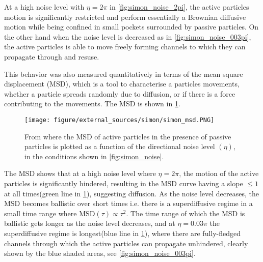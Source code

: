 At a high noise level with $\eta=2\pi$ in \cref{fig:simon_noise_2pi}, the active particles motion is significantly 
restricted and perform essentially a Brownian diffusive motion while being confined in small pockets surrounded by passive particles. 
On the other hand when the noise level is decreased as in \cref{fig:simon_noise_003pi}, the active particles is 
able to move freely forming channels to which they can propagate through and resuse.

This behavior was also measured quantitatively in terms of the mean square displacement (MSD), which 
is a tool to characterise a particles movements, whether a particle spreads randomly due to diffusion, or 
if there is a force contributing to the movements. The MSD is shown in \cref{fig:simon_msd}.

\begin{figure}[htp]
    \centering
    \texttt{[image: figure/external\_sources/simon/simon\_msd.PNG]}
    \caption{From \cite{nilsson2017metastable} where the MSD 
    of active particles in the presence of passive particles is plotted as a function of the directional
    noise level $(\eta)$, in the conditions shown in \cref{fig:simon_noise}.}
    \label{fig:simon_msd}
\end{figure}

The MSD shows that at a high noise level where $\eta=2\pi$, the motion of the active particles 
is significantly hindered, resulting in the MSD curve having a slope $\leq1$ at all times(green line in \cref{fig:simon_msd}), 
suggesting diffusion. As the noise level decreases, the MSD becomes ballistic over short times i.e. there 
is a superdiffusive regime in a small time range where $\text{MSD}(\tau)\propto\tau^2$. The time range of which the MSD is ballistic gets longer 
as the noise level decreases, and at $\eta=0.03\pi$ the superdiffusive regime is longest(blue line in \cref{fig:simon_msd}), where there are fully-fledged channels 
through which the active particles can propagate unhindered, clearly shown by the blue shaded areas, see \cref{fig:simon_noise_003pi}. 



